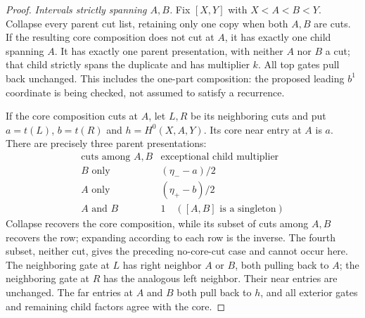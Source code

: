 \begin{proof}
\emph{Intervals strictly spanning $A,B$.}
Fix $[X,Y]$ with $X<A<B<Y$. Collapse every parent cut list, retaining
only one copy when both $A,B$ are cuts. If the resulting core
composition does not cut at $A$, it has exactly one child spanning $A$.
It has exactly one parent presentation, with neither $A$ nor $B$ a cut;
that child strictly spans the duplicate and has multiplier $k$.
All top gates pull back unchanged. This includes the one-part
composition: the proposed leading $b^1$ coordinate is being checked,
not assumed to satisfy a recurrence.

If the core composition cuts at $A$, let $L,R$ be its neighboring cuts
and put $a=t(L)$, $b=t(R)$ and $h=H^0(X,A,Y)$. Its core near entry at
$A$ is $a$. There are precisely three parent presentations:
\begin{equation}\label{aspr:three-presentations}
\begin{array}{c|c}
\text{cuts among }A,B&\text{exceptional child multiplier}\\\hline
B\text{ only}&(\eta_--a)/2\\
A\text{ only}&(\eta_+-b)/2\\
A\text{ and }B&1\quad([A,B]\text{ is a singleton})
\end{array}
\end{equation}
Collapse recovers the core composition, while its subset of cuts among
$A,B$ recovers the row; expanding according to each row is the inverse.
The fourth subset, neither cut, gives the preceding no-core-cut case
and cannot occur here. The neighboring gate at $L$ has right neighbor
$A$ or $B$, both pulling back to $A$; the neighboring gate at $R$
has the analogous left neighbor. Their near entries are unchanged.
The far entries at $A$ and $B$ both pull back to $h$, and all exterior
gates and remaining child factors agree with the core.


\end{proof}
